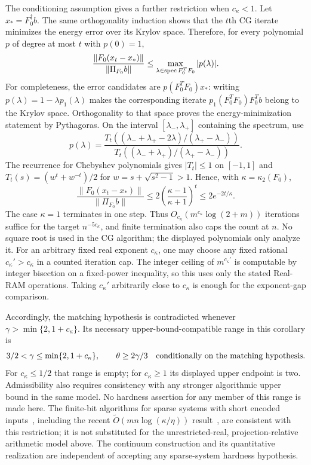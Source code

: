 The conditioning assumption gives a further restriction when $c_\kappa<1$.
Let $x_*=F_0^\dagger b$.
The same orthogonality induction shows that the $t$th CG iterate
minimizes the energy error over its Krylov space. Therefore, for
every polynomial $p$ of degree at most $t$ with $p(0)=1$,
\[
 \frac{\|F_0(x_t-x_*)\|}{\|\Pi_{F_0}b\|}
 \le \max_{\lambda\in\operatorname{spec} F_0^TF_0}|p(\lambda)|.
\]
For completeness, the error candidates are $p(F_0^TF_0)x_*$: writing
$p(\lambda)=1-\lambda p_1(\lambda)$ makes the corresponding iterate
$p_1(F_0^TF_0)F_0^Tb$ belong to the Krylov space. Orthogonality to that
space proves the energy-minimization statement by Pythagoras.
On the interval $[\lambda_-,\lambda_+]$ containing the spectrum, use
\[
 p(\lambda)=
 \frac{T_t((\lambda_-+\lambda_+-2\lambda)/(\lambda_+-\lambda_-))}{T_t((\lambda_-+\lambda_+)/(\lambda_+-\lambda_-))}.
\]
The recurrence for Chebyshev polynomials gives $|T_t|\le1$ on
$[-1,1]$ and $T_t(s)=(w^t+w^{-t})/2$ for
$w=s+\sqrt{s^2-1}>1$. Hence, with
$\kappa=\kappa_2(F_0)$,
\[
 \frac{\|F_0(x_t-x_*)\|}{\|\Pi_{F_0}b\|}
 \le2\left(\frac{\kappa-1}{\kappa+1}\right)^t
 \le2e^{-2t/\kappa}.
\]
The case $\kappa=1$ terminates in one step. Thus
$O_{c_\kappa}(m^{c_\kappa}\log(2+m))$ iterations suffice for the target
$n^{-5c_\kappa}$, and finite termination also caps the count at $n$.
No square root is used in the CG algorithm; the displayed polynomials
only analyze it. For an arbitrary fixed real exponent $c_\kappa$,
one may choose any fixed rational $c_\kappa'>c_\kappa$ in a counted iteration
cap. The integer ceiling of $m^{c_\kappa'}$ is computable by integer
bisection on a fixed-power inequality, so this uses only the stated
Real-RAM operations. Taking $c_\kappa'$ arbitrarily close to $c_\kappa$ is enough
for the exponent-gap comparison.

Accordingly, the matching hypothesis is contradicted whenever
$\gamma>\min\{2,1+c_\kappa\}$. Its necessary upper-bound-compatible range
in this corollary is
\begin{equation}
 3/2<\gamma\le\min\{2,1+c_\kappa\},\qquad \theta\ge2\gamma/3
 \quad\hbox{conditionally on the matching hypothesis}.          \label{c:eq:gamma-range}
\end{equation}
For $c_\kappa\le1/2$ that range is empty; for $c_\kappa\ge1$ its displayed
upper endpoint is two. Admissibility also requires consistency
with any stronger algorithmic upper bound in the same model.
No hardness assertion for any member of this range is made here.
The finite-bit algorithms for sparse systems with short encoded
inputs~\cite{pengvempala2021,nie2022}, including the recent
$\widetilde O(mn\log(\kappa/\eta))$ result~\cite{kelner2026}, are
consistent with this restriction; it is not substituted for the unrestricted-real,
projection-relative arithmetic model above. The continuum construction
and its quantitative realization are independent of accepting any
sparse-system hardness hypothesis.

